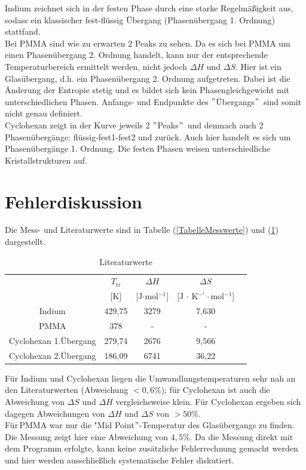 \documentclass[12pt,a4paper,titlepage,headinclude,bibtotoc]{scrartcl}
\begin{document}
Indium zeichnet sich in der festen Phase durch eine starke Regelmäßigkeit aus, sodass ein klassischer fest-flüssig Übergang (Phasenübergang 1. Ordnung) stattfand.\\
 
 Bei PMMA sind wie zu erwarten 2 Peaks zu sehen. Da es sich bei PMMA um einen Phasenübergang 2. Ordnung handelt, kann nur der entsprechende Temperaturbereich ermittelt werden, nicht jedoch $\Delta H$ und $\Delta S$. Hier ist ein Glasübergang, d.h. ein Phasenübergang 2. Ordnung aufgetreten. Dabei ist die Änderung der Entropie stetig und es bildet sich kein Phasengleichgewicht mit unterschiedlichen Phasen. Anfangs- und Endpunkte des $"$Übergangs$"$\, sind somit nicht genau definiert.\\
  
Cyclohexan zeigt in der Kurve jeweils 2 $"$Peaks$"$\, und demnach auch 2 Phasenübergänge: flüssig-fest1-fest2 und zurück. Auch hier handelt es sich um Phasenübergänge 1. Ordnung. Die festen Phasen weisen unterschiedliche Kristallstrukturen auf.\\
 
\section{Fehlerdiskussion}

Die Mess- und Literaturwerte sind in Tabelle (\ref{TabelleMesswerte}) und (\ref{TabelleLiteraturwerte}) dargestellt.


\begin{table} [h!] \label{TabelleLiteraturwerte}
\caption{Literaturwerte} %
\begin{tabular}{c|c|c|c|c}
  & $T_\mathrm{tr}$  & $\Delta H$  & $\Delta S$ \\ 
 & [K] & [J$\cdot$mol$^{-1}$] & [J $\cdot$ K$^{-^1}\cdot$mol$^{-1}$] \\
\hline 
Indium & 429,75 \footnotemark &3279 & 7,630 \\ 
\hline 
PMMA & 378\footnotemark& - & -  \\ 
\hline
Cyclohexan 1.Übergang &  279,74 \footnotemark &2676& 9,566\\ 
Cyclohexan 2.Übergang & 186,09 \footnotemark &6741& 36,22\\ 
\end{tabular}
\end{table}
\FloatBarrier


Für Indium und Cyclohexan liegen die Umwandlungstemperaturen sehr nah an den Literaturwerten (Abweichung $< 0,6\% $); für Cyclohexan ist auch die Abweichung von $\Delta S$ und $\Delta H$ vergleichsweise klein. Für Cyclohexan ergeben sich dagegen Abweichungen von $\Delta H$ und $\Delta S$ von $> 50\%$.\\
Für\,PMMA war nur die "Mid Point$"$-Temperatur des Glasübergangs zu finden. Die Messung zeigt hier eine Abweichung von $4,5\%$.
Da die Messung direkt mit dem Programm erfolgte, kann keine zusätzliche Fehlerrechnung gemacht werden und hier werden ausschließlich systematische Fehler diskutiert.\\
\end{document}
